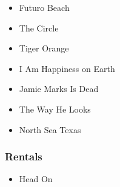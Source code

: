 \documentclass[twocolumn]{article}
\begin{document}
\begin{itemize}

\item Futuro Beach
\item The Circle
\item Tiger Orange
\item I Am Happiness on Earth
\item Jamie Marks Is Dead
\item The Way He Looks
\item North Sea Texas

\end{itemize}

\subsubsection{Rentals}

\begin{itemize}

\item Head On

\end{itemize}
\end{document}
